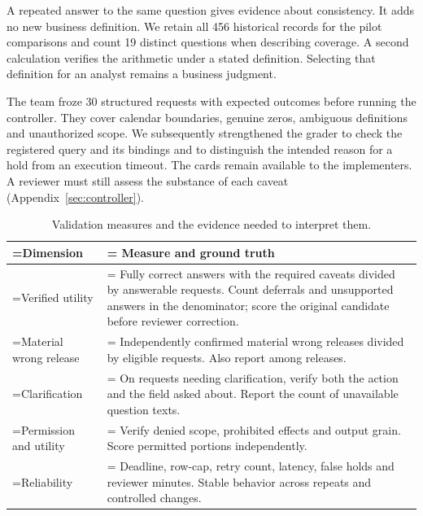 \documentclass[11pt,a4paper,onecolumn,oneside]{rho-class/rho}
\begin{document}
\label{sec:s5}

A repeated answer to the same question gives evidence about consistency. It adds no new business definition. We retain all 456 historical records for the pilot comparisons and count 19 distinct questions when describing coverage. A second calculation verifies the arithmetic under a stated definition. Selecting that definition for an analyst remains a business judgment.

The team froze 30 structured requests with expected outcomes before running the controller. They cover calendar boundaries, genuine zeros, ambiguous definitions and unauthorized scope. We subsequently strengthened the grader to check the registered query and its bindings and to distinguish the intended reason for a hold from an execution timeout. The cards remain available to the implementers. A reviewer must still assess the substance of each caveat (Appendix~\ref{sec:controller}).

{\setlength{\tabcolsep}{6pt}
\renewcommand{\arraystretch}{1.35}
\begin{table}[H]
\centering
\small
\begin{tabularx}{\linewidth}{@{}>{\hsize=0.580\hsize\linewidth=\hsize\RaggedRight\arraybackslash}X>{\hsize=1.420\hsize\linewidth=\hsize\RaggedRight\arraybackslash}X@{}}
\toprule
\textbf{Dimension} & \textbf{Measure and ground truth} \\ \midrule
Verified utility & Fully correct answers with the required caveats divided by answerable requests. Count deferrals and unsupported answers in the denominator; score the original candidate before reviewer correction. \\
Material wrong release & Independently confirmed material wrong releases divided by eligible requests. Also report among releases. \\
Clarification & On requests needing clarification, verify both the action and the field asked about. Report the count of unavailable question texts. \\
Permission and utility & Verify denied scope, prohibited effects and output grain. Score permitted portions independently. \\
Reliability & Deadline, row-cap, retry count, latency, false holds and reviewer minutes. Stable behavior across repeats and controlled changes. \\
\bottomrule
\end{tabularx}
\caption{Validation measures and the evidence needed to interpret them.}
\end{table}
}
\end{document}
